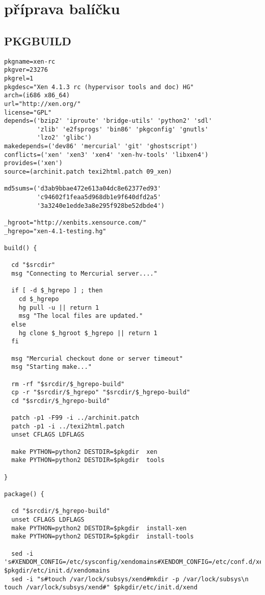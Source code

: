 \chapter{\xen příprava balíčku}
\section{PKGBUILD}

\begin{lstlisting}
pkgname=xen-rc
pkgver=23276
pkgrel=1
pkgdesc="Xen 4.1.3 rc (hypervisor tools and doc) HG"
arch=(i686 x86_64)
url="http://xen.org/"
license="GPL"
depends=('bzip2' 'iproute' 'bridge-utils' 'python2' 'sdl'
         'zlib' 'e2fsprogs' 'bin86' 'pkgconfig' 'gnutls'
         'lzo2' 'glibc')
makedepends=('dev86' 'mercurial' 'git' 'ghostscript')
conflicts=('xen' 'xen3' 'xen4' 'xen-hv-tools' 'libxen4')
provides=('xen')
source=(archinit.patch texi2html.patch 09_xen)

md5sums=('d3ab9bbae472e613a04dc8e62377ed93'
         'c94602f1feaa5d968db1e9f640dfd2a5'
         '3a3240e1edde3a8e295f928be52dbde4')
			   
_hgroot="http://xenbits.xensource.com/"
_hgrepo="xen-4.1-testing.hg"

build() {

  cd "$srcdir"
  msg "Connecting to Mercurial server...."

  if [ -d $_hgrepo ] ; then
    cd $_hgrepo
    hg pull -u || return 1
    msg "The local files are updated."
  else
    hg clone $_hgroot $_hgrepo || return 1
  fi

  msg "Mercurial checkout done or server timeout"
  msg "Starting make..."

  rm -rf "$srcdir/$_hgrepo-build"
  cp -r "$srcdir/$_hgrepo" "$srcdir/$_hgrepo-build"
  cd "$srcdir/$_hgrepo-build"

  patch -p1 -F99 -i ../archinit.patch
  patch -p1 -i ../texi2html.patch
  unset CFLAGS LDFLAGS

  make PYTHON=python2 DESTDIR=$pkgdir  xen
  make PYTHON=python2 DESTDIR=$pkgdir  tools  
    
}

package() {

  cd "$srcdir/$_hgrepo-build"
  unset CFLAGS LDFLAGS
  make PYTHON=python2 DESTDIR=$pkgdir  install-xen
  make PYTHON=python2 DESTDIR=$pkgdir  install-tools  
  
  sed -i 's#XENDOM_CONFIG=/etc/sysconfig/xendomains#XENDOM_CONFIG=/etc/conf.d/xendomains#' $pkgdir/etc/init.d/xendomains
  sed -i "s#touch /var/lock/subsys/xend#mkdir -p /var/lock/subsys\n     touch /var/lock/subsys/xend#" $pkgdir/etc/init.d/xend


\end{lstlisting}
